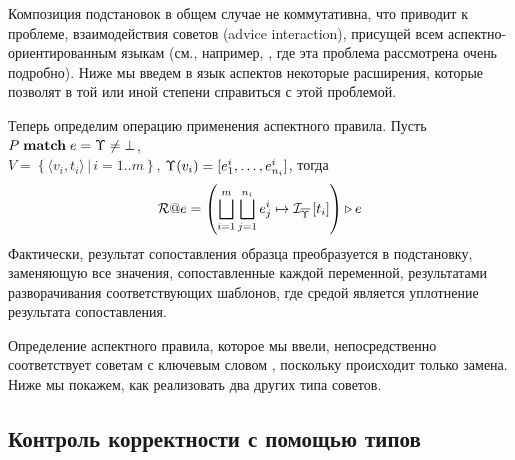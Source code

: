 \begin{Note}
Композиция подстановок в общем случае не коммутативна, что приводит к проблеме, взаимодействия советов (advice interaction), присущей всем аспектно-ориентированным языкам (см., например, \cite{???}, где эта проблема рассмотрена очень подробно). Ниже мы введем в язык аспектов некоторые расширения, которые позволят в той или иной степени справиться с этой проблемой.
\end{Note}

Теперь определим операцию применения аспектного правила.
Пусть $P \; \mathbf{match} \; e = \Upsilon \neq \bot$, \\$V = \left\{\langle v_i, t_i \rangle \,|\, i = 1..m \right\}$,  $\Upsilon(v_i) = [e^i_1, \ldots, e^i_{n_i}]$, тогда
	$$\mathcal{R}@e
		= \left( \bigsqcup\limits_{i=1}^{m} \bigsqcup\limits_{j=1}^{n_i}
			e^i_j \mapsto \mathcal{I}_{\overline{\Upsilon}} \left[ t_i \right] \right) \triangleright e$$
Фактически, результат сопоставления образца преобразуется в подстановку, заменяющую все значения, сопоставленные каждой переменной, результатами разворачивания соответствующих шаблонов, где средой является уплотнение результата сопоставления.

\begin{Note}
Определение аспектного правила, которое мы ввели, непосредственно соответствует советам с ключевым словом , поскольку происходит только замена. Ниже мы покажем, как реализовать два других типа советов.
\end{Note}

\subsection{Контроль корректности с помощью типов}

